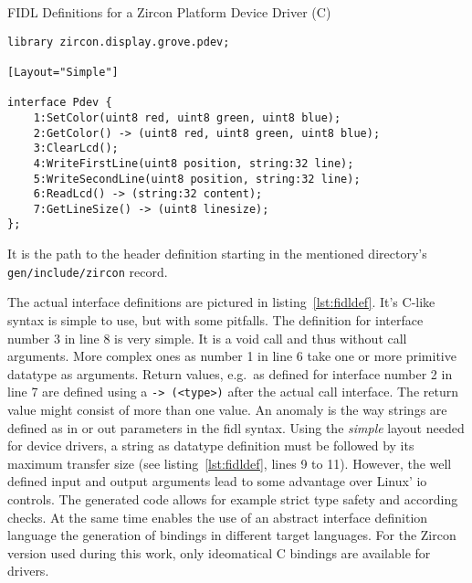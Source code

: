 \begin{listing} [H]
    \caption{FIDL Definitions for a Zircon Platform Device Driver (C)}
\label{lst:fidldef}
\begin{verbatim}
library zircon.display.grove.pdev;

[Layout="Simple"]

interface Pdev {
    1:SetColor(uint8 red, uint8 green, uint8 blue);
    2:GetColor() -> (uint8 red, uint8 green, uint8 blue);
    3:ClearLcd();
    4:WriteFirstLine(uint8 position, string:32 line);
    5:WriteSecondLine(uint8 position, string:32 line);
    6:ReadLcd() -> (string:32 content);
    7:GetLineSize() -> (uint8 linesize);
};
\end{verbatim}
\end{listing}

It is the path to the header definition starting in the mentioned directory's \texttt{gen/include/zircon} record.

The actual interface definitions are pictured in listing~\ref{lst:fidldef}.
It's C-like syntax is simple to use, but with some pitfalls.
The definition for interface number 3 in line 8 is very simple.
It is a void call and thus without call arguments.
More complex ones as number 1 in line 6 take one or more primitive datatype as arguments.
Return values, e.g.\ as defined for interface number 2 in line 7 are defined using a \texttt{-> (<type>)} after the actual call interface.
The return value might consist of more than one value.
An anomaly is the way strings are defined as in or out parameters in the \ac{fidl} syntax.
Using the \textit{simple} layout needed for device drivers, a string as datatype definition must be followed by its maximum transfer size (see listing~\ref{lst:fidldef}, lines 9 to 11).
However, the well defined input and output arguments lead to some advantage over Linux' \ac{io} controls.
The generated code allows for example strict type safety and according checks.
At the same time enables the use of an abstract interface definition language the generation of bindings in different target languages.
For the Zircon version used during this work, only ideomatical C bindings are available for drivers.

